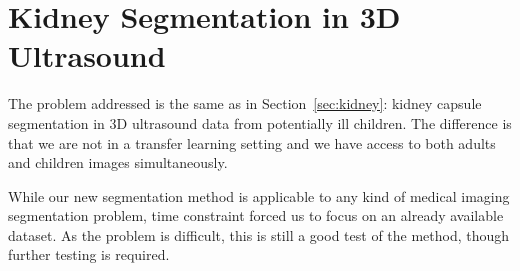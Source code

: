 

\section{Kidney Segmentation in 3D Ultrasound}
\label{sec:seg_data}

The problem addressed is the same as in Section~\ref{sec:kidney}: kidney capsule segmentation in 3D ultrasound data from potentially ill children. The difference is that we are not in a transfer learning setting and we have access to both adults and children images simultaneously.

While our new segmentation method is applicable to any kind of medical imaging segmentation problem, time constraint forced us to focus on an already available dataset. As the problem is difficult, this is still a good test of the method, though further testing is required. 


